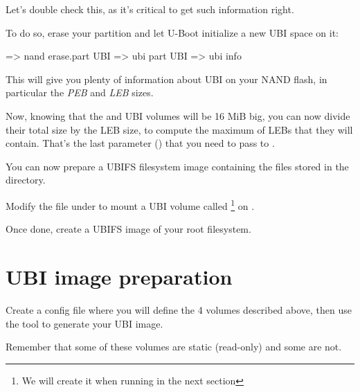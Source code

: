 Let's double check this, as it's critical to get such information right.

To do so, erase your  partition and let U-Boot initialize
a new UBI space on it:

\begin{ubootinput}
=> nand erase.part UBI
=> ubi part UBI
=> ubi info
\end{ubootinput}

This will give you plenty of information about UBI on your NAND flash,
in particular the {\em PEB} and {\em LEB} sizes.

Now, knowing that the  and  UBI volumes will be 16
MiB big, you can now divide their total size by the LEB size, to compute
the maximum of LEBs that they will contain. That's the last parameter
() that you need to pass to .

You can now prepare a UBIFS filesystem image containing the files
stored in the  directory.

Modify the  file under  to mount a
UBI volume called  \footnote{We will create it when
running  in the next section} on .

Once done, create a UBIFS image of your root filesystem.

\section{UBI image preparation}

Create a  config file where you will define the 4 volumes
described above, then use the  tool to generate your
UBI image.

Remember that some of these volumes are static (read-only) and some are
not.

%
%

%
%
%
%
%
%


